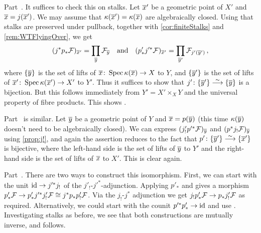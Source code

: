 \begin{proof*}
	Part~. It suffices to check this on stalks. Let $\ov{x}'$ be a geometric point of $X'$ and $\ov{x}=j(\ov{x}')$. We may assume that $\kappa(\ov{x}')=\kappa(\ov{x})$ are algebraically closed. Using that stalks are preserved under pullback, together with \cref{cor:finiteStalks} and \cref{rem:WTFlyingOver}, we get
	\begin{equation*}
		(j^*p_*\Ff)_{\ov{x}'}=\prod_{\ov{y}}\Ff_{\ov{y}}\quad\text{and}\quad (p'_*j'^*\Ff)_{\ov{x}'}=\prod_{\ov{y}'}\Ff_{j'(\ov{y}')}\,,
	\end{equation*}
	where $\{\ov{y}\}$ is the set of lifts of $\ov{x}\colon \Spec \kappa(\ov{x})\morphism X$ to $Y$, and $\{\ov{y}'\}$ is the set of lifts of $\ov{x}'\colon \Spec \kappa(\ov{x}')\morphism X'$ to $Y'$. Thus it suffices to show that $j'\colon \{\ov{y}'\}\isomorphism \{\ov{y}\}$ is a bijection. But this follows immediately from $Y'=X'\times_XY$ and the universal property of fibre products. This shows .
	
	Part~ is similar. Let $\ov{y}$ be a geometric point of $Y$ and $\ov{x}=p(\ov{y})$ (this time $\kappa(\ov{y})$ doesn't need to be algebraically closed). We can express $(j'_!p'^*\Ff)_{\ov{y}}$ and $(p^*j_!\Ff)_{\ov{y}}$ using \cref{prop:j!}, and again the assertion reduces to the fact that $p'\colon \{\ov{y}'\}\isomorphism \{\ov{x}'\}$ is bijective, where the left-hand side is the set of lifts of $\ov{y}$ to $Y'$ and the right-hand side is the set of lifts of $\ov{x}$ to $X'$. This is clear again.
	
	Part~. There are two ways to construct this isomorphism. First, we can start with the unit $\id\morphism j'^*j_!$ of the $j'_!$-$j'^*$-adjunction. Applying $p'_*$ and  gives a morphism $p'_*\Ff\morphism p'_*j'^*j'_!\Ff\cong j^*p_*p'_!\Ff$. Via the $j_!$-$j^*$ adjunction we get $j_!p'_*\Ff \morphism p_*j'_!\Ff$ as required. Alternatively, we could start with the counit $p'^*p'_*\morphism \id$ and use . Investigating stalks as before, we see that both constructions are mutually inverse, and  follows.
\end{proof*}
